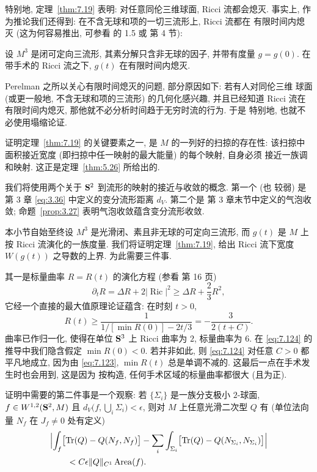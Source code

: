 特别地, 定理~\ref{thm:7.19} 表明: 对任意同伦三维球面, Ricci 流都会熄灭.
事实上, 作为推论我们还得到: 在不含无球和项的一切三流形上, Ricci 流都在
有限时间内熄灭 (这为何容易推出, 可参看 \cite{Pe1} 的 1.5 或 \cite{CM19}
第 4 节):

\begin{corollary}
\label{cor:7.20}
设 $M^3$ 是闭可定向三流形, 其素分解只含非无球的因子, 并带有度量
$g=g(0)$. 在带手术的 Ricci 流之下, $g(t)$ 在有限时间内熄灭.
\end{corollary}

Perelman 之所以关心有限时间熄灭的问题, 部分原因如下: 若有人对同伦三维
球面 (或更一般地, 不含无球和项的三流形) 的几何化感兴趣, 并且已经知道
Ricci 流在有限时间内熄灭, 那他就不必分析时间趋于无穷时流的行为. 于是
特别地, 也就不必使用塌缩论证.

证明定理~\ref{thm:7.19} 的关键要素之一, 是 $M$ 的一列好的扫掠的存在性:
该扫掠中面积接近宽度 (即扫掠中任一映射的最大能量) 的每个映射, 自身必须
接近一族调和映射. 这正是定理~\ref{thm:5.26} 所给出的.

我们将使用两个关于 $\mathbf{S}^2$ 到流形的映射的接近与收敛的概念. 第一个 (也
较弱) 是第 3 章 \eqref{eq:3.36} 中定义的变分流形距离 $d_V$. 第二个是
第 3 章末节中定义的气泡收敛; 命题~\ref{prop:3.27} 表明气泡收敛蕴含变分流形收敛.

本小节自始至终设 $M^3$ 是光滑闭、素且非无球的可定向三流形, 而 $g(t)$
是 $M$ 上按 Ricci 流演化的一族度量. 我们将证明定理~\ref{thm:7.19}, 给出
Ricci 流下宽度 $W(g(t))$ 之导数的上界. 为此需要三件事.

其一是标量曲率 $R=R(t)$ 的演化方程 (参看 \cite{Ha2} 第 16 页)
\begin{equation}
\partial_tR=\Delta R+2|\operatorname{Ric}|^2
\geq\Delta R+\frac23R^2,
\label{eq:7.123}
\end{equation}
它经一个直接的最大值原理论证蕴含: 在时刻 $t>0$,
\begin{equation}
R(t)\geq\frac1{1/[\min R(0)]-2t/3}=-\frac3{2(t+C)}.
\label{eq:7.124}
\end{equation}
曲率已作归一化, 使得在单位 $\mathbf{S}^3$ 上 Ricci 曲率为 $2$, 标量曲率为 $6$.
在 \eqref{eq:7.124} 的推导中我们隐含假定 $\min R(0)<0$. 若并非如此, 则
\eqref{eq:7.124} 对任意 $C>0$ 都平凡地成立, 因为由 \eqref{eq:7.123},
$\min R(t)$ 总是单调不减的. 这最后一点在手术发生时也会用到, 这是因为
按构造, 任何手术区域的标量曲率都很大 (且为正).

证明中需要的第二件事是一个观察: 若 $\{\Sigma_i\}$ 是一族分支极小
$2$-球面, $f\in W^{1,2}(\mathbf{S}^2,M)$ 且
$d_V\bigl(f,\bigcup_i\Sigma_i\bigr)<\epsilon$, 则对 $M$ 上任意光滑二次型
$Q$ 有 (单位法向量 $N_f$ 在 $J_f\neq0$ 处有定义)
\begin{equation}
\begin{aligned}
&\Bigl|\int_f\bigl[\operatorname{Tr}(Q)-Q(N_f,N_f)\bigr]
-\sum_i\int_{\Sigma_i}\bigl[\operatorname{Tr}(Q)
-Q(N_{\Sigma_i},N_{\Sigma_i})\bigr]\Bigr|\\
&\qquad<C\epsilon\|Q\|_{C^1}\operatorname{Area}(f).
\end{aligned}
\label{eq:7.125}
\end{equation}

